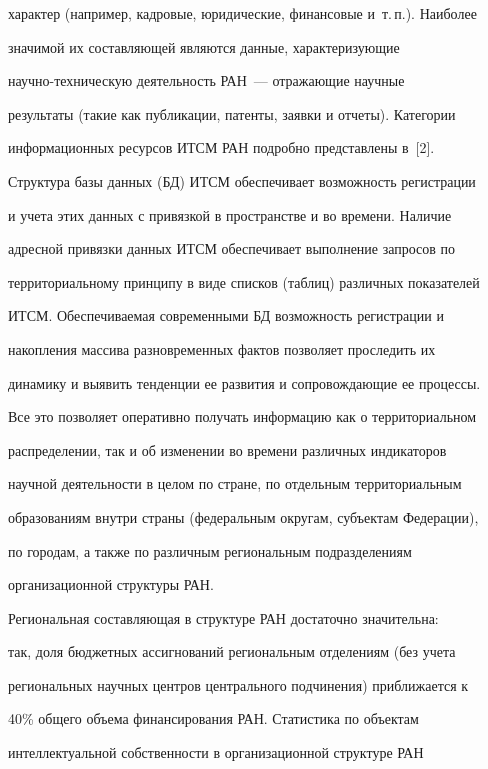 характер (например, кадровые, юридические, финансовые и~т.\,п.). Наиболее 


значимой их составляющей являются данные, ха\-рак\-те\-ри\-зу\-ющие 


     на\-уч\-но-тех\-ни\-че\-скую деятельность РАН~--- отражающие научные 


результаты (такие как публикации, патенты, заявки и отчеты). Категории 


информационных ресурсов ИТСМ РАН подробно представлены в~[2].


     


     Структура базы данных (БД) ИТСМ обеспечивает возможность регистрации 


и учета этих данных с привязкой в пространстве и во времени. Наличие 


адресной привязки данных ИТСМ обеспечивает выполнение запросов по 


территориальному принципу в виде списков (таблиц) различных показателей 


ИТСМ. Обеспечиваемая современными БД возможность регистрации и 


накопления массива разновременных фактов позволяет проследить их 


динамику и выявить тенденции ее развития и сопровождающие ее процессы. 


Все это позволяет оперативно получать информацию как о территориальном 


распределении, так и об изменении во времени различных индикаторов 


научной деятельности в целом по стране, по отдельным  территориальным 


образованиям внутри страны (федеральным округам, субъектам Федерации), 


по городам, а также по различным региональным подразделениям 


организационной структуры РАН. 


     


     Региональная составляющая в структуре РАН достаточно значительна: 


так, доля бюджетных ассигнований региональным отделениям (без учета 


региональных научных центров центрального подчинения) приближается к 


40\% общего объема финансирования РАН. Статистика по объектам 


интеллектуальной собственности в организационной структуре РАН 


